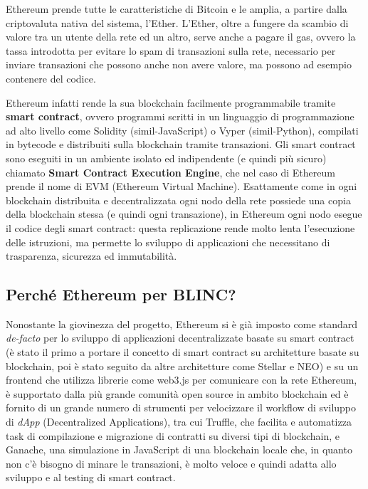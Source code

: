 Ethereum prende tutte le caratteristiche di Bitcoin e le amplia, a partire dalla criptovaluta nativa del sistema, l'Ether.
L'Ether, oltre a fungere da scambio di valore tra un utente della rete ed un altro, serve anche a pagare il gas, ovvero la tassa
introdotta per evitare lo spam di transazioni sulla rete, necessario per inviare transazioni che possono anche non avere valore,
ma possono ad esempio contenere del codice.

Ethereum infatti rende la sua blockchain facilmente programmabile tramite \textbf{smart contract}, ovvero programmi scritti
in un linguaggio di programmazione ad alto livello come Solidity (simil-JavaScript) o Vyper (simil-Python),
compilati in bytecode e distribuiti sulla blockchain tramite transazioni. 
Gli smart contract sono eseguiti in un ambiente isolato ed indipendente (e quindi più sicuro)
chiamato \textbf{Smart Contract Execution Engine}, che nel caso di Ethereum prende il nome di EVM (Ethereum Virtual Machine).
Esattamente come in ogni blockchain distribuita e decentralizzata ogni nodo della rete possiede una copia della blockchain stessa
(e quindi ogni transazione), in Ethereum ogni nodo esegue il codice degli smart contract: questa replicazione rende molto lenta
l’esecuzione delle istruzioni, ma permette lo sviluppo di applicazioni che necessitano di trasparenza, sicurezza ed immutabilità.

\subsection{Perché Ethereum per BLINC?}

Nonostante la giovinezza del progetto, Ethereum si è già imposto come standard \emph{de-facto}
per lo sviluppo di applicazioni decentralizzate basate su smart contract
(è stato il primo a portare il concetto di smart contract su architetture
basate su blockchain, poi è stato seguito da altre architetture come Stellar e NEO)
e su un frontend che utilizza librerie come web3.js per comunicare con la rete Ethereum,
è supportato dalla più grande comunità open source in ambito blockchain ed è fornito di un grande numero
di strumenti per velocizzare il workflow di sviluppo di \emph{dApp} (Decentralized Applications), tra cui
Truffle, che facilita e automatizza task di compilazione e migrazione di contratti su diversi tipi di blockchain,
e Ganache, una simulazione in JavaScript di una blockchain locale che, in quanto non c'è bisogno di minare le
transazioni, è molto veloce e quindi adatta allo sviluppo e al testing di smart contract.

